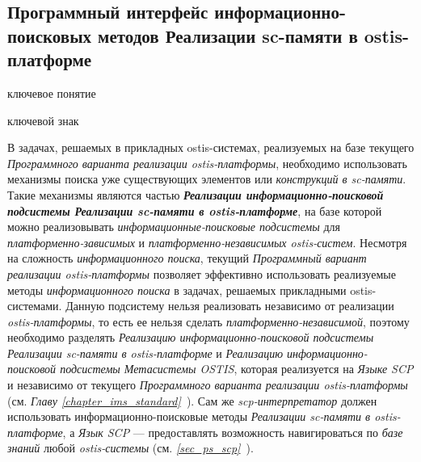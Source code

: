 \subsection{Программный интерфейс информационно-поисковых методов Реализации sc-памяти в ostis-платформе}
\label{sec_soft_platform_information_retrieval_subsystem}

\begin{SCn}
	
\begin{scnrelfromlist}{ключевое понятие}
\end{scnrelfromlist}	
	
\begin{scnrelfromlist}{ключевой знак}
\end{scnrelfromlist}
	
\end{SCn}

В задачах, решаемых в прикладных ostis-системах, реализуемых на базе текущего \textit{Программного варианта реализации ostis-платформы}, необходимо использовать механизмы поиска уже существующих элементов или \textit{конструкций в sc-памяти}. Такие механизмы являются частью \textbf{\textit{Реализации информационно-поисковой подсистемы Реализации sc-памяти в ostis-платформе}}, на базе которой можно реализовывать \textit{информационные-поисковые подсистемы} для \textit{платформенно-зависимых} и \textit{платформенно-независимых ostis-систем}. Несмотря на сложность \textit{информационного поиска}, текущий \textit{Программный вариант реализации ostis-платформы} позволяет эффективно использовать реализуемые методы \textit{информационного поиска} в задачах, решаемых прикладными ostis-системами. Данную подсистему нельзя реализовать независимо от реализации \textit{ostis-платформы}, то есть ее нельзя сделать \textit{платформенно-независимой}, поэтому необходимо разделять \textit{Реализацию информационно-поисковой подсистемы Реализации sc-памяти в ostis-платформе} и \textit{Реализацию информационно-поисковой подсистемы Метасистемы OSTIS}, которая реализуется на \textit{Языке SCP} и независимо от текущего \textit{Программного варианта реализации ostis-платформы} (см. \textit{Главу \ref{chapter_ims_standard}~}). Сам же \textit{scp-интерпретатор} должен использовать информационно-поисковые методы \textit{Реализации sc-памяти в ostis-платформе}, а \textit{Язык SCP} --- предоставлять возможность навигироваться по \textit{базе знаний} любой \textit{ostis-системы} (см. \textit{\ref{sec_ps_scp}~}).

